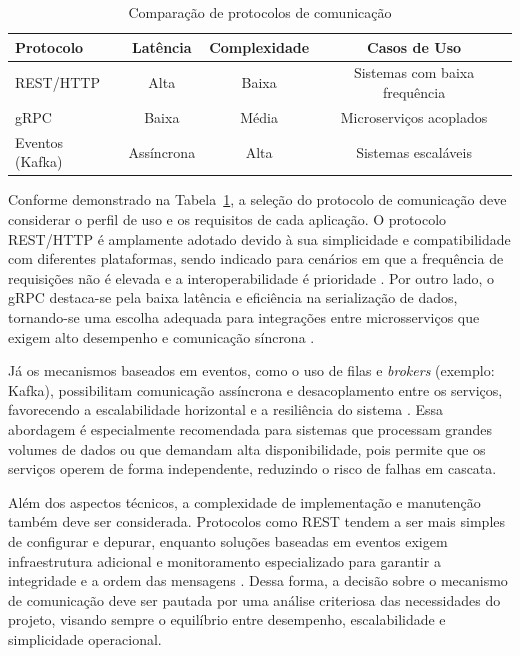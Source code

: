 \begin{table}[H]
\centering
\caption{Comparação de protocolos de comunicação}
\begin{tabular}{|l|c|c|c|}
\hline
Protocolo & Latência & Complexidade & Casos de Uso \\
\hline
REST/HTTP & Alta & Baixa & Sistemas com baixa frequência \\
gRPC & Baixa & Média & Microserviços acoplados \\
Eventos (Kafka) & Assíncrona & Alta & Sistemas escaláveis \\
\hline
\end{tabular}
\label{tab:protocolos}
\end{table}

Conforme demonstrado na Tabela~\ref{tab:protocolos}, a seleção do protocolo de comunicação deve considerar o perfil de uso e os requisitos de cada aplicação. O protocolo REST/HTTP é amplamente adotado devido à sua simplicidade e compatibilidade com diferentes plataformas, sendo indicado para cenários em que a frequência de requisições não é elevada e a interoperabilidade é prioridade \cite{fielding2000rest, aws:1}. Por outro lado, o gRPC destaca-se pela baixa latência e eficiência na serialização de dados, tornando-se uma escolha adequada para integrações entre microsserviços que exigem alto desempenho e comunicação síncrona \cite{niswar2023performance, ibm:7}.

Já os mecanismos baseados em eventos, como o uso de filas e \textit{brokers} (exemplo: Kafka), possibilitam comunicação assíncrona e desacoplamento entre os serviços, favorecendo a escalabilidade horizontal e a resiliência do sistema \cite{jamshidi2016systematic, shekhar2023microservices}. Essa abordagem é especialmente recomendada para sistemas que processam grandes volumes de dados ou que demandam alta disponibilidade, pois permite que os serviços operem de forma independente, reduzindo o risco de falhas em cascata.

Além dos aspectos técnicos, a complexidade de implementação e manutenção também deve ser considerada. Protocolos como REST tendem a ser mais simples de configurar e depurar, enquanto soluções baseadas em eventos exigem infraestrutura adicional e monitoramento especializado para garantir a integridade e a ordem das mensagens \cite{maso2024comparativo, observability2023}. Dessa forma, a decisão sobre o mecanismo de comunicação deve ser pautada por uma análise criteriosa das necessidades do projeto, visando sempre o equilíbrio entre desempenho, escalabilidade e simplicidade operacional.

